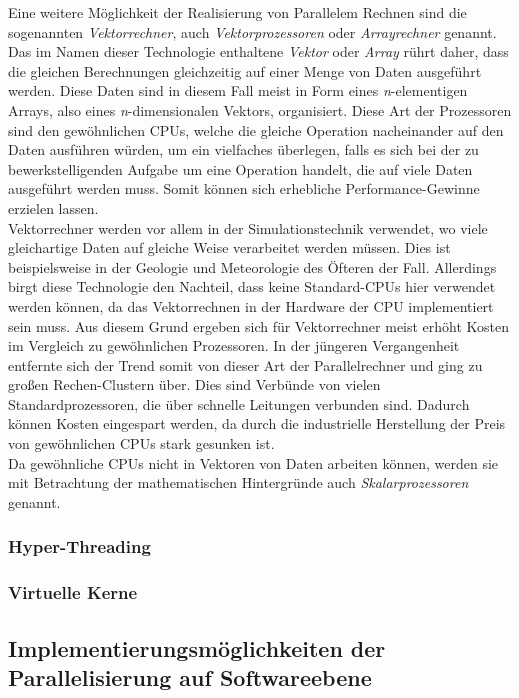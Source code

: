 				Eine weitere Möglichkeit der Realisierung von Parallelem Rechnen sind die sogenannten \textit{Vektorrechner}, auch \textit{Vektorprozessoren} oder \textit{Arrayrechner} genannt.\\
				Das im Namen dieser Technologie enthaltene \textit{Vektor} oder \textit{Array} rührt daher, dass die gleichen Berechnungen gleichzeitig auf einer Menge von Daten ausgeführt werden. Diese Daten sind in diesem Fall meist in Form eines \textit{n}-elementigen Arrays, also eines \textit{n}-dimensionalen Vektors, organisiert.
				Diese Art der Prozessoren sind den gewöhnlichen CPUs, welche die gleiche Operation nacheinander auf den Daten ausführen würden, um ein vielfaches überlegen, falls es sich bei der zu bewerkstelligenden Aufgabe um eine Operation handelt, die auf viele Daten ausgeführt werden muss. Somit können sich erhebliche Performance-Gewinne erzielen lassen.\\
				Vektorrechner werden vor allem in der Simulationstechnik verwendet, wo viele gleichartige Daten auf gleiche Weise verarbeitet werden müssen. Dies ist beispielsweise in der Geologie und Meteorologie des Öfteren der Fall.
				Allerdings birgt diese Technologie den Nachteil, dass keine Standard-CPUs hier verwendet werden können, da das Vektorrechnen in der Hardware der CPU implementiert sein muss. Aus diesem Grund ergeben sich für Vektorrechner meist erhöht Kosten im Vergleich zu gewöhnlichen Prozessoren. In der jüngeren Vergangenheit entfernte sich der Trend somit von dieser Art der Parallelrechner und ging zu großen Rechen-Clustern über. Dies sind Verbünde von vielen Standardprozessoren, die über schnelle Leitungen verbunden sind. Dadurch können Kosten eingespart werden, da durch die industrielle Herstellung der Preis von gewöhnlichen CPUs stark gesunken ist.\\
				Da gewöhnliche CPUs nicht in Vektoren von Daten arbeiten können, werden sie mit Betrachtung der mathematischen Hintergründe auch \textit{Skalarprozessoren} genannt. \cite{VektorrechnerWikipedia}
				
			\subsubsection{Hyper-Threading}
			
			\subsubsection{Virtuelle Kerne}
				
		\subsection{Implementierungsmöglichkeiten der Parallelisierung auf Softwareebene}

